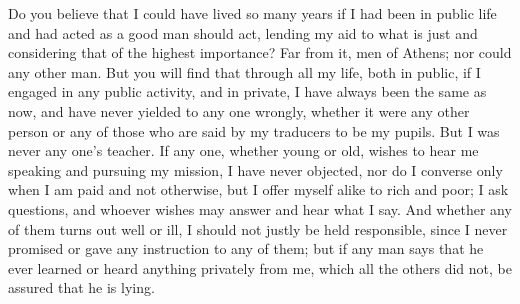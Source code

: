 Do you believe that I could have lived so many years if I had been in public life and had acted as a good man should act, lending my aid to what is just and considering that of the highest importance? Far from it, men of Athens; nor could  any other man. But you will find that through all my life, both in public, if I engaged in any public activity, and in private, I have always been the same as now, and have never yielded to any one wrongly, whether it were any other person or any of those who are said by my traducers to be my pupils. But I was never any one's teacher. If any one, whether young or old, wishes to hear me speaking and pursuing my mission, I have never objected,  nor do I converse only when I am paid and not otherwise, but I offer myself alike to rich and poor; I ask questions, and whoever wishes may answer and hear what I say. And whether any of them turns out well or ill, I should not justly be held responsible, since I never promised or gave any instruction to any of them; but if any man says that he ever learned or heard anything privately from me, which all the others did not, be assured that he is lying.

